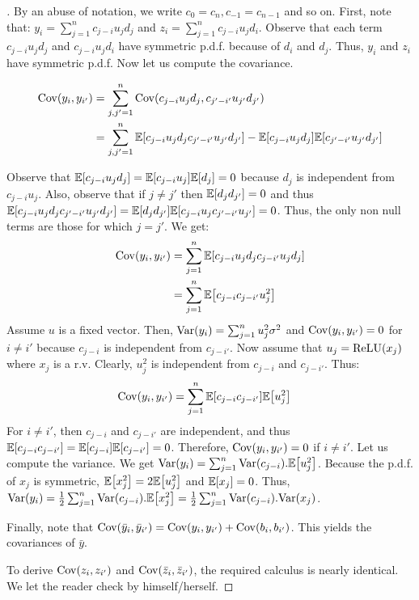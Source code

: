 \begin{proof}[]
By an abuse of notation, we write $c_{0}=c_{n},c_{-1}=c_{n-1}$ and so on.
First, note that: $y_{i}=\sum_{j=1}^{n}c_{j-i}u_{j}d_{j}$ and $z_{i}=\sum_{j=1}^{n}c_{j-i}u_{j}d_{i}$.
Observe that each term $c_{j-i}u_{j}d_{j}$ and $c_{j-i}u_{j}d_{i}$ have symmetric p.d.f. because of $d_{i}$ and $d_{j}$.
Thus, $y_{i}$ and $z_{i}$ have symmetric p.d.f. Now let us compute the covariance.

\begin{align}
    \Cov(y_{i},y_{i'}) &= \sum_{j,j'=1}^{n} \Cov\left(c_{j-i}u_{j}d_{j},c_{j'-i'}u_{j'}d_{j'}\right) \\
        &= \sum_{j,j'=1}^{n}\Ebb\left[c_{j-i}u_{j}d_{j}c_{j'-i'}u_{j'}d_{j'}\right] - \Ebb\left[c_{j-i}u_{j}d_{j}\right] \Ebb\left[ c_{j'-i'}u_{j'}d_{j'} \right]
\end{align}

Observe that $\Ebb\left[c_{j-i}u_{j}d_{j}\right]=\Ebb\left[c_{j-i}u_{j}\right]\Ebb\left[d_{j}\right]=0$ because $d_{j}$ is independent from $c_{j-i}u_{j}$.
Also, observe that if $j\neq j'$ then $\Ebb\left[d_{j}d_{j'}\right]=0$ and thus $\Ebb\left[c_{j-i}u_{j}d_{j}c_{j'-i'}u_{j'}d_{j'}\right]=\Ebb\left[d_{j}d_{j'}\right]\Ebb\left[c_{j-i}u_{j}c_{j'-i'}u_{j'}\right]=0$.
Thus, the only non null terms are those for which $j=j'$. We get:
\begin{align*}
  \Cov(y_{i},y_{i'}) & =\sum_{j=1}^{n}\Ebb\left[c_{j-i}u_{j}d_{j}c_{j-i'}u_{j}d_{j}\right] \\
   & =\sum_{j=1}^{n}\Ebb\left[c_{j-i}c_{j-i'}u_{j}^{2}\right]
\end{align*}
Assume $u$ is a fixed vector. Then, $\mathrm{Var}(y_{i})=\sum_{j=1}^{n}u_{j}^{2}\sigma^{2}$ and $\mathrm{Cov}(y_{i},y_{i'})=0$ for $i\neq i'$ because $c_{j-i}$ is independent from $c_{j-i'}$.
Now assume that $u_{j} = \operatorname{ReLU}(x_{j})$ where $x_{j}$ is a r.v. Clearly, $u_{j}^{2}$ is independent from $c_{j-i}$ and $c_{j-i'}$. Thus:
\begin{align*}
  \Cov(y_{i},y_{i'}) & =\sum_{j=1}^{n}\Ebb \left[ c_{j-i}c_{j-i'}\right] \Ebb\left[ u_{j}^{2} \right]
\end{align*}
For $i\neq i'$, then $c_{j-i}$ and $c_{j-i'}$ are independent, and thus $\Ebb\left[c_{j-i}c_{j-i'}\right]=\Ebb\left[c_{j-i}\right]\Ebb\left[c_{j-i'}\right]=0$.
Therefore, $\mathrm{Cov}(y_{i},y_{i'}) = 0$ if $i \neq i'$.
Let us compute the variance.
We get $\Var(y_{i})=\sum_{j=1}^{n} \Var(c_{j-i}).\Ebb\left[u_{j}^{2}\right]$.
Because the p.d.f. of $x_{j}$ is symmetric, $\Ebb\left[x_{j}^{2}\right]=2\Ebb\left[u_{j}^{2}\right]$ and $\Ebb\left[x_{j}\right]=0$.
Thus, $\Var(y_{i})=\frac{1}{2}\sum_{j=1}^{n} \Var(c_{j-i}).
\Ebb\left[x_{j}^{2}\right]=\frac{1}{2}\sum_{j=1}^{n} \Var(c_{j-i}).\Var(x_{j})$.

Finally, note that $\mathrm{Cov} (\bar{y}_{i},\bar{y}_{i'}) = \mathrm{Cov}( y_{i},y_{i'} ) + \mathrm{Cov}( b_{i},b_{i'} )$. This yields the covariances of $\bar{y}$.

To derive $\mathrm{Cov}(z_{i},z_{i'})$ and $\mathrm{Cov}(\bar{z}_{i},\bar{z}_{i'})$, the required calculus is nearly identical. We let the reader check by himself/herself.
\end{proof}


